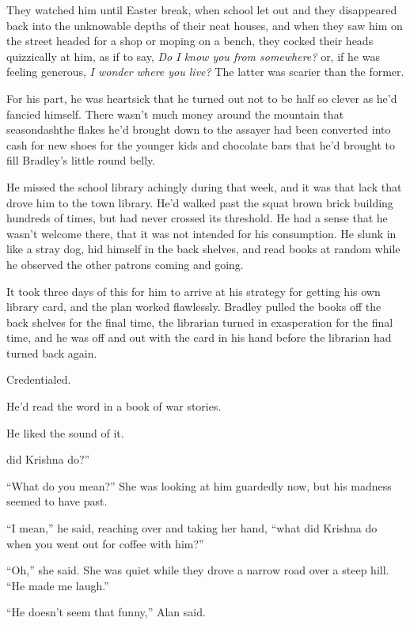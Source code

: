 They watched him until Easter break, when school let out and they
disappeared back into the unknowable depths of their neat houses, and
when they saw him on the street headed for a shop or moping on a
bench, they cocked their heads quizzically at him, as if to say,
\textit{Do I know you from somewhere?} or, if he was feeling generous,
\textit{I wonder where you live?} The latter was scarier than the
former.

For his part, he was heartsick that he turned out not to be half so
clever as he'd fancied himself.  There wasn't much money around the
mountain that seasondash{}the flakes he'd brought down to the assayer had
been converted into cash for new shoes for the younger kids and
chocolate bars that he'd brought to fill Bradley's little round belly.

He missed the school library achingly during that week, and it was
that lack that drove him to the town library.  He'd walked past the
squat brown brick building hundreds of times, but had never crossed
its threshold.  He had a sense that he wasn't welcome there, that it
was not intended for his consumption.  He slunk in like a stray dog,
hid himself in the back shelves, and read books at random while he
observed the other patrons coming and going.

It took three days of this for him to arrive at his strategy for
getting his own library card, and the plan worked flawlessly.  Bradley
pulled the books off the back shelves for the final time, the
librarian turned in exasperation for the final time, and he was off
and out with the card in his hand before the librarian had turned back
again.

Credentialed.

He'd read the word in a book of war stories.

He liked the sound of it.

did Krishna do?''

``What do you mean?'' She was looking at him guardedly now, but his
madness seemed to have past.

``I mean,'' he said, reaching over and taking her hand, ``what did
Krishna do when you went out for coffee with him?''

``Oh,'' she said.  She was quiet while they drove a narrow road over a
steep hill.  ``He made me laugh.''

``He doesn't seem that funny,'' Alan said.

